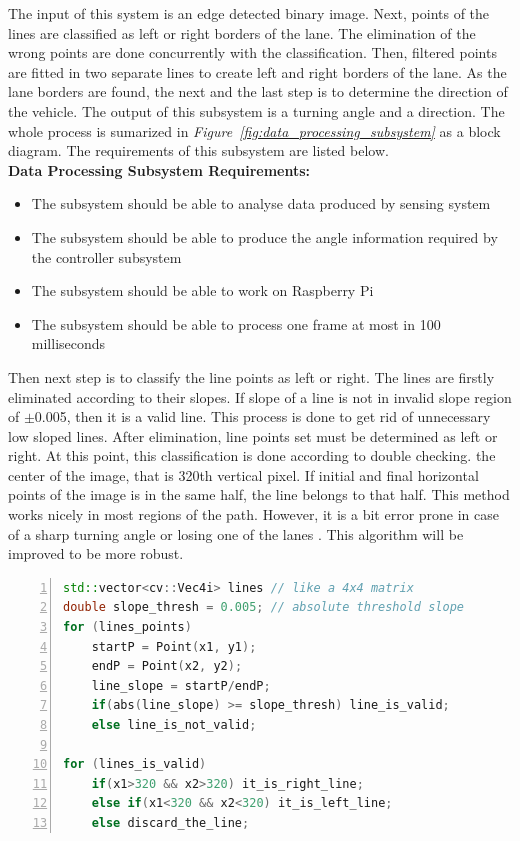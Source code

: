\documentclass[a4paper,12pt]{article}
\begin{document}
	The input of this system is an edge detected binary image.  Next, points of the lines are classified as left or right borders of the lane. The elimination of the wrong points are done concurrently with the classification. Then, filtered points are fitted in two separate lines to create left and right borders of the lane. As the lane borders are found, the next and the last step is to determine the direction of the vehicle. The output of this subsystem is a turning angle and a direction. The whole process is sumarized in \textit{Figure~\ref{fig:data_processing_subsystem}} as a block diagram. The requirements of this subsystem are listed below.\\
	
	\textbf{Data Processing Subsystem Requirements:}	
	
	\begin{itemize}
		\item The subsystem should be able to analyse data produced by sensing system
		\item The subsystem should be able to produce the angle information required by the controller subsystem
		\item The subsystem should be able to work on Raspberry Pi
		\item The subsystem should be able to process one frame at most in 100 milliseconds
	\end{itemize}

	Then next step is to classify the line points as left or right. The lines are firstly eliminated according to their slopes. If slope of a line is not in invalid slope region of $\pm$0.005, then it is a valid line. This process is done to get rid of unnecessary low sloped lines. After elimination, line points set must be determined as left or right. At this point, this classification is done according to double checking. the center of the image, that is 320th vertical pixel. If initial and final horizontal points of the image is in the same half, the line belongs to that half. This method works nicely in most regions of the path. However, it is a bit error prone in case of a sharp turning angle or losing one of the lanes . This algorithm will be improved to be more robust.
	\begin{lstlisting}[language=C++,float=t,numbers=left,frame=single,caption=The Algorithm to Classify the Lane Lines as Right or Left, captionpos=b, label=sc:left-right-lines]
std::vector<cv::Vec4i> lines // like a 4x4 matrix
double slope_thresh = 0.005; // absolute threshold slope
for (lines_points)
	startP = Point(x1, y1);
	endP = Point(x2, y2);
	line_slope = startP/endP;
	if(abs(line_slope) >= slope_thresh) line_is_valid;
	else line_is_not_valid;

for (lines_is_valid)	
	if(x1>320 && x2>320) it_is_right_line;
	else if(x1<320 && x2<320) it_is_left_line;
	else discard_the_line;
	\end{lstlisting}
	
\end{document}
